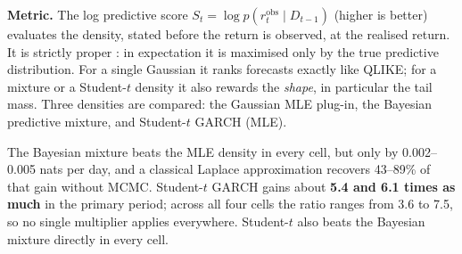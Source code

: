\documentclass[11pt]{article}
\begin{document}
\textbf{Metric.} The log predictive score $S_t=\log p(r_t^{\text{obs}}\mid D_{t-1})$ (higher is better) evaluates the
density, stated before the return is observed, at the realised return. It is strictly proper \cite{gneiting2007}: in expectation it is
maximised only by the true predictive distribution. For a single Gaussian it ranks forecasts exactly like QLIKE; for a
mixture or a Student-$t$ density it also rewards the \emph{shape}, in particular the tail mass. Three densities are
compared: the Gaussian MLE plug-in, the Bayesian predictive mixture, and Student-$t$ GARCH (MLE).

\begin{table}[h]\centering\small
{}
\caption{H2. Pooled four-ETF contrasts; $p$-values from Newey--West Diebold--Mariano tests. In 2023--26 all
Bayesian gains have $p\le0.024$ and all Student-$t$ comparisons $p\le0.011$.}\label{tab:h2}
\end{table}

The Bayesian mixture beats the MLE density in every cell, but only by 0.002--0.005 nats per day, and a classical
Laplace approximation recovers 43--89\% of that gain without MCMC. Student-$t$ GARCH gains about \textbf{5.4 and 6.1
times as much} in the primary period; across all four cells the ratio ranges from 3.6 to 7.5, so no single multiplier
applies everywhere. Student-$t$ also beats the Bayesian mixture directly in every cell.
\end{document}
